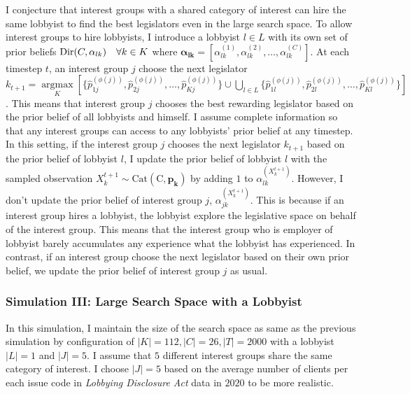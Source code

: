 \documentclass{article}
\begin{document}
I conjecture 
that interest groups
with a shared category of interest 
can hire the same lobbyist
to find the best legislators 
even in the large search space.
To allow interest groups to hire lobbyists,
I introduce a lobbyist $l \in L$ with its own set 
of prior beliefs $\operatorname{Dir}(C, \boldmath{\alpha}_{lk}) \quad \forall k \in K$ 
where $\mathbf{\alpha_{lk}} = [\alpha_{lk}^{(1)}, \alpha_{lk}^{(2)}, \hdots, \alpha_{lk}^{(C)}]$.
At each timestep $t$,
an interest group $j$ choose 
the next legislator $k_{t+1} = \underset{K}{\operatorname{argmax}}\left[\{\hat{p}^{(\phi(j))}_{1j}, \hat{p}^{(\phi(j))}_{2j}, \hdots, \hat{p}^{(\phi(j))}_{Kj}\}\cup\bigcup_{l\in L}\{\hat{p}^{(\phi(j))}_{1l}, \hat{p}^{(\phi(j))}_{2l}, \hdots, \hat{p}^{(\phi(j))}_{Kl}\}\right]$. 
This means that 
interest group $j$ chooses the best rewarding legislator based on the prior belief of all lobbyists and himself.
I assume complete information so that 
any interest groups can 
access to any lobbyists' prior belief at any timestep. 
In this setting, 
if the interest group $j$ 
chooses the next legislator $k_{t+1}$ 
based on 
the prior belief of lobbyist $l$, 
I update the prior belief of lobbyist 
$l$ with the sampled observation $X_{k}^{t+1} \sim \operatorname{Cat(C, \mathbf{p_k})}$
by adding $1$ to $\alpha_{lk}^{(X_k^{t+1})}$.
However, 
I don't update the 
prior belief of interest group $j$, $\alpha_{jk}^{(X_k^{t+1})}$.
This is because
if an interest group hires a lobbyist,
the lobbyist explore the legislative space on behalf of the interest group. 
This means that the interest group who is employer of lobbyist 
barely accumulates any experience what 
the lobbyist has experienced.
In contrast, 
if an interest group choose the next legislator 
based on their own prior belief,
we update the prior belief of interest group $j$ as usual.

\subsubsection{Simulation III: Large Search Space with a Lobbyist}

In this simulation, I maintain the size of the search space as same as the previous simulation 
by configuration of $|K|=112, |C|=26, |T|=2000$
with a lobbyist $|L|=1$ and $|J|=5$. I assume that $5$ different interest groups
share the same category of interest. I choose $|J|=5$ based on the 
average number of clients per each issue code in 
\textit{Lobbying Disclosure Act} data in $2020$ to be more realistic.
\end{document}
